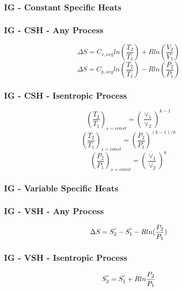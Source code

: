 \documentclass[10pt,landscape]{article}
\begin{document}
\begin{multicols}{3}
\subsubsection{IG - Constant Specific Heats}
\subsubsection{IG - CSH - Any Process}
\begin{equation}
    \Delta S = C_{v,avg}ln(\frac{T_2}{T_1})+Rln(\frac{V_2}{V_1})
\end{equation}
\begin{equation}
    \Delta S = C_{p,avg}ln(\frac{T_2}{T_1})-Rln(\frac{P_2}{P_1})
\end{equation}
\subsubsection{IG - CSH - Isentropic Process}
\begin{equation}
   (\frac{T_2}{T_1})_{s=const}=(\frac{\vee_1}{\vee_2})^{k-1} 
\end{equation}
\begin{equation}
    (\frac{T_2}{T_1})_{s=const}=(\frac{P_2}{P_1})^{(k-1)/k}
\end{equation}
\begin{equation}
    (\frac{P_2}{P_1})_{s=const}=(\frac{\vee_1}{\vee_2})^k
\end{equation}
\subsubsection{IG - Variable Specific Heats}
\subsubsection{IG - VSH - Any Process}
\begin{equation}
    \Delta S = S_2^{\degree} - S_1^{\degree} - Rln(\frac{P_2}{P_1})
\end{equation}
\subsubsection{IG - VSH - Isentropic Process}
\begin{equation}
    S^\degree_2=S_1^\degree+Rln\frac{P_2}{P_1}
\end{equation}

\end{multicols}
\end{document}
